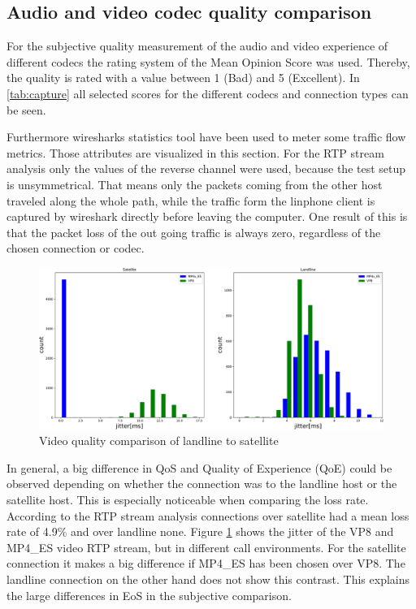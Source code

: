 \documentclass[parskip=full]{scrartcl}
\begin{document}
\subsection{Audio and video codec quality comparison} \label{subsec:audio}
For the subjective quality measurement of the audio and video experience of different codecs the rating system of the Mean Opinion Score was used.
Thereby, the quality is rated with a value between 1 (Bad) and 5 (Excellent). 
In \cref{tab:capture} all selected scores for the different codecs and connection types can be seen.

Furthermore wiresharks statistics tool have been used to meter some traffic flow metrics. Those attributes are visualized in this section. For the RTP stream analysis only the values of the reverse channel were used, because the test setup is unsymmetrical.
That means only the packets coming from the other host traveled along the whole path, while the traffic form the linphone client is captured by wireshark directly before leaving the computer.
One result of this is that the packet loss of the out going traffic is always zero, regardless of the chosen connection or codec.

\begin{figure}[!ht]
	\centering %
	\includegraphics[width=\textwidth]{images/comparison.pdf} %
	\caption{Video quality comparison of landline to satellite} 
	\label{fig:comparison} %
\end{figure} 



In general, a big difference in QoS and Quality of Experience (QoE) could be observed depending on whether the connection was to the landline host or the satellite host.
This is especially noticeable when comparing the loss rate.
According to the RTP stream analysis connections over satellite had a mean loss rate of 4.9\% and over landline none. 
Figure \ref{fig:comparison} shows the jitter of the VP8 and MP4\_ES video RTP stream, but in different call environments. 
For the satellite connection it makes a big difference if MP4\_ES has been chosen over VP8. 
The landline connection on the other hand does not show this contrast.
This explains the large differences in EoS in the subjective comparison.
\end{document}
